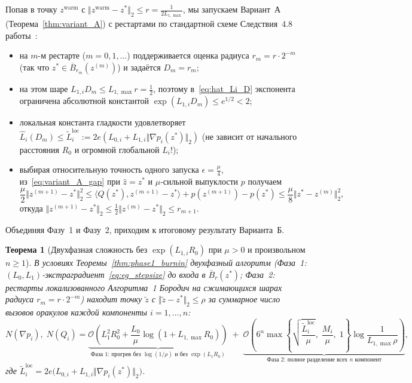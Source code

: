 \documentclass[11pt, a4paper]{article}
\newtheorem{theorem}{Теорема}[section]
\theoremstyle{definition}
\begin{document}
Попав в точку $z^{\mathrm{warm}}$ с $\Vert z^{\mathrm{warm}} - z^* \Vert_2 \le r = \frac{1}{2 L_{1,\max}}$, мы запускаем Вариант~А (Теорема~\ref{thm:variant_A}) с рестартами по стандартной схеме Следствия~4.8 работы~\cite{Borodich2025}:
\begin{itemize}
    \item на $m$-м рестарте ($m = 0, 1, \dots$) поддерживается оценка радиуса $r_m = r \cdot 2^{-m}$ (так что $z^* \in \overline{B}_{r_m}(z^{(m)})$) и задаётся $D_m = r_m$;
    \item на этом шаре $L_{1,i} D_m \le L_{1,\max} r = \frac{1}{2}$, поэтому в~\eqref{eq:hat_Li_D} экспонента ограничена абсолютной константой $\exp(L_{1,i} D_m) \le e^{1/2} < 2$;
    \item локальная константа гладкости удовлетворяет $\widehat{L}_i(D_m) \le \widetilde{L}_i^{\mathrm{loc}} := 2 e (L_{0,i} + L_{1,i}\Vert \nabla p_i(z^*) \Vert_2)$ (не зависит от начального расстояния $R_0$ и огромной глобальной $L_i$!);
    \item выбирая относительную точность одного запуска $\epsilon = \frac{\mu}{4}$, из~\eqref{eq:variant_A_gap} при $\hat{z} = z^*$ и $\mu$-сильной выпуклости $p$ получаем
    \[
    \frac{\mu}{2}\Vert z^{(m+1)} - z^* \Vert_2^2 \le \langle Q(z^*), z^{(m+1)} - z^* \rangle + p(z^{(m+1)}) - p(z^*) \le \frac{\mu}{8}\Vert z^* - z^{(m)} \Vert_2^2,
    \]
    откуда $\Vert z^{(m+1)} - z^* \Vert_2 \le \frac{1}{2}\Vert z^{(m)} - z^* \Vert_2 \le r_{m+1}$.
\end{itemize}

Объединяя Фазу~1 и Фазу~2, приходим к итоговому результату Варианта~Б.

\begin{theorem}[Двухфазная сложность без $\exp(L_{1,i} R_0)$ при $\mu > 0$ и произвольном $n \ge 1$]\label{thm:variant_B_twophase}
В условиях Теоремы~\ref{thm:phase1_burnin} двухфазный алгоритм (Фаза~1: $(L_0, L_1)$-экстраградиент~\eqref{eq:eg_stepsize} до входа в $\overline{B}_r(z^*)$; Фаза~2: рестарты локализованного Алгоритма~1 Бородич на сжимающихся шарах радиуса $r_m = r \cdot 2^{-m}$) находит точку $\tilde{z}$ с $\Vert \tilde{z} - z^* \Vert_2 \le \rho$ за суммарное число вызовов оракулов каждой компоненты $i = 1, \dots, n$:
\begin{equation}\label{eq:twophase_total}
N(\nabla p_i),\; N(Q_i) = \underbrace{\mathcal{O}\!\left(L_1^2 R_0^2 + \frac{L_0}{\mu}\log(1 + L_{1,\max} R_0)\right)}_{\text{Фаза 1: прогрев без } \log(1/\rho) \text{ и без } \exp(L_1 R_0)} \;+\; \underbrace{\mathcal{O}\!\left(6^n \max\left\{\sqrt{\frac{\widetilde{L}_i^{\mathrm{loc}}}{\mu}},\; \frac{M_i}{\mu},\; 1\right\} \log\frac{1}{L_{1,\max} \rho}\right)}_{\text{Фаза 2: полное разделение всех } n \text{ компонент}},
\end{equation}
где $\widetilde{L}_i^{\mathrm{loc}} = 2 e \big(L_{0,i} + L_{1,i}\Vert \nabla p_i(z^*) \Vert_2\big)$.
\end{theorem}
\end{document}

